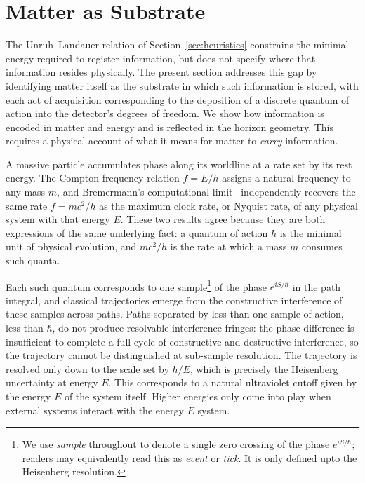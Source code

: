 \documentclass[12pt,a4paper]{article}
\begin{document}
\section{Matter as Substrate}
\label{sec:substrate}

The Unruh–Landauer relation of Section~\ref{sec:heuristics} constrains the minimal energy required to register information, but does not specify where that information resides physically. The present section addresses this gap by identifying matter itself as the substrate in which such information is stored, with each act of acquisition corresponding to the deposition of a discrete quantum of action into the detector’s degrees of freedom. We show how information is encoded in matter and energy and is reflected in the horizon geometry. This requires a physical account of what it means for matter to \emph{carry} information.

A massive particle accumulates phase along its worldline at a rate set by its rest energy. The Compton frequency relation $f = E/h$ assigns a natural frequency to any mass $m$, and Bremermann's computational limit~\cite{bremermann1962optimization} independently recovers the same rate $f = mc^2/h$ as the maximum clock rate, or Nyquist rate, of any physical system with that energy $E$. These two results agree because they are both expressions of the same underlying fact: a quantum of action $\hbar$ is the minimal unit of physical evolution, and $mc^2/h$ is the rate at which a mass $m$ consumes such quanta.

Each such quantum corresponds to one sample\footnote{We use \emph{sample} throughout to denote a single zero crossing of the phase $e^{iS/\hbar}$; readers may equivalently read this as \emph{event} or \emph{tick}. It is only defined upto the Heisenberg resolution.} of the phase $e^{iS/\hbar}$ in the path integral, and classical trajectories emerge from the constructive interference of these samples across paths. Paths separated by less than one sample of action, less than $\hbar$, do 
not produce resolvable interference fringes: the phase difference is 
insufficient to complete a full cycle of constructive and destructive 
interference, so the trajectory cannot be distinguished at sub-sample 
resolution. The trajectory is resolved only down to the scale set by 
$\hbar/E$, which is precisely the Heisenberg uncertainty at energy $E$.
This corresponds to a natural ultraviolet cutoff given by the energy $E$ of the system itself. Higher energies only come into play when external systems interact with the energy $E$ system. 
\end{document}
